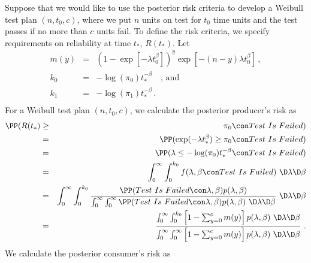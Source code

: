 \documentclass {book}
\begin{document}
Suppose that we would like to use the posterior risk criteria to
develop a Weibull test plan $(n,t_0,c)$, where we put $n$ units on
test for $t_0$ time units and the test passes if no more than $c$
units fail. To define the risk criteria, we specify requirements
on reliability at time $t_*$, $R(t_*)$. Let
\begin{eqnarray*}
m(y) & = & (1 - \exp[-\lambda t_0^{\beta}])^{y}
\exp[-(n-y)\lambda t_0^{\beta}] \, ,\\
k_0 & = & -\log(\pi_0)t_*^{-\beta} \quad \mbox{, and}\\
k_1 & = & -\log(\pi_1)t_*^{-\beta} \, .\\
\end{eqnarray*}
For a Weibull test plan $(n,t_0,c)$,
we calculate the posterior producer's risk as
\begin{eqnarray}\label{ch10:wppr}
\PP(R(t_*) & \geq & \pi_0 \con Test\mbox{ }Is\mbox{ }Failed)\\
\mbox{} & = & \PP(\exp(-\lambda t_*^\beta) \geq \pi_0 \con
Test\mbox{ }Is\mbox{ }Failed)\nonumber\\ \mbox{} & = & \PP(\lambda
\leq -\log(\pi_0)t_*^{-\beta} \con Test\mbox{ }Is\mbox{ }Failed)\nonumber\\
\mbox{} & = & \int_{0}^{\infty} \int_{0}^{k_0} f(\lambda, \beta
\con
Test\mbox{ }Is\mbox{ }Failed) \, \, \D \lambda \D \beta\nonumber\\
\mbox{} & = & \int_{0}^{\infty} \int_{0}^{k_0}
\frac{\PP(Test\mbox{ }Is\mbox{ }Failed \con \lambda, \beta)
p(\lambda, \beta)}{\int_0^{\infty}\int_0^{\infty} \PP(Test\mbox{
}Is\mbox{ }Failed \con \lambda, \beta)p(\lambda,\beta) \, \, \D
\lambda \D \beta} \, \, \D \lambda \D \beta\nonumber\\ \mbox{} & =
& \frac{\int_{0}^{\infty} \int_{0}^{k_0} \left[1 - \sum_{y=0}^{c}
m(y) \right] p(\lambda,\beta) \, \, \D \lambda \D
\beta}{\int_0^{\infty}\int_0^{\infty} \left[1 - \sum_{y=0}^{c}
m(y) \right] p(\lambda,\beta) \, \, \D \lambda \D \beta}\nonumber
\, \, .
\end{eqnarray}
We calculate the posterior consumer's risk as
\end{document}
